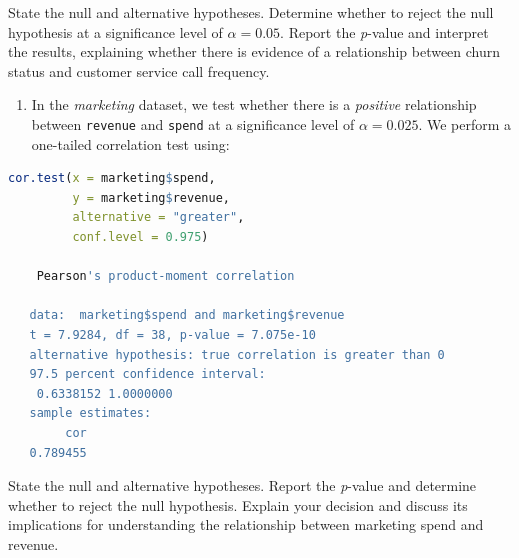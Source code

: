 \documentclass[
]{book}
\newcommand{\passthrough}[1]{#1}
\providecommand{\tightlist}{%
  \setlength{\itemsep}{0pt}\setlength{\parskip}{0pt}}
\theoremstyle{definition}
\theoremstyle{definition}
\theoremstyle{definition}
\theoremstyle{definition}
\theoremstyle{remark}
\begin{document}
State the null and alternative hypotheses. Determine whether to reject the null hypothesis at a significance level of \(\alpha=0.05\). Report the \emph{p}-value and interpret the results, explaining whether there is evidence of a relationship between churn status and customer service call frequency.

\begin{enumerate}
\def\labelenumi{\arabic{enumi}.}
\setcounter{enumi}{14}
\tightlist
\item
  In the \emph{marketing} dataset, we test whether there is a \emph{positive} relationship between \passthrough{\lstinline!revenue!} and \passthrough{\lstinline!spend!} at a significance level of \(\alpha = 0.025\). We perform a one-tailed correlation test using:
\end{enumerate}

\begin{lstlisting}[language=R]
cor.test(x = marketing$spend, 
         y = marketing$revenue, 
         alternative = "greater", 
         conf.level = 0.975)
   
    Pearson's product-moment correlation
   
   data:  marketing$spend and marketing$revenue
   t = 7.9284, df = 38, p-value = 7.075e-10
   alternative hypothesis: true correlation is greater than 0
   97.5 percent confidence interval:
    0.6338152 1.0000000
   sample estimates:
        cor 
   0.789455
\end{lstlisting}

State the null and alternative hypotheses. Report the \emph{p}-value and determine whether to reject the null hypothesis. Explain your decision and discuss its implications for understanding the relationship between marketing spend and revenue.
\end{document}
